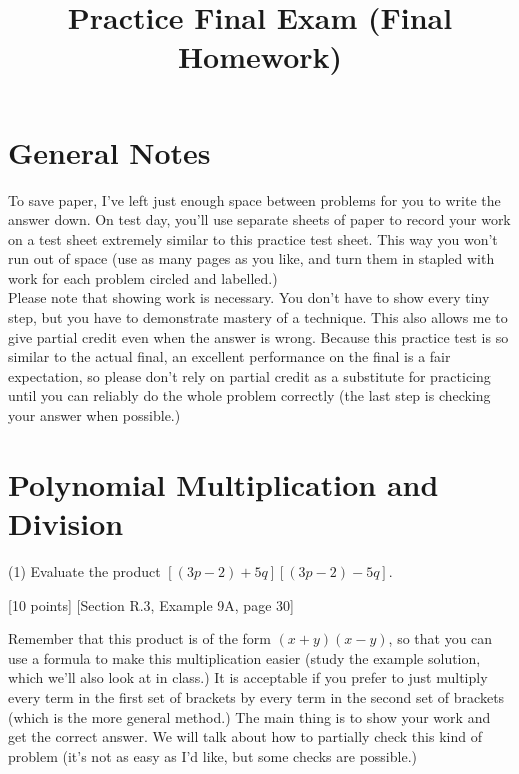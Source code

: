 \documentclass{article}
\title{Practice Final Exam (Final Homework)}
\begin{document}
\maketitle

\section{General Notes}
To save paper, I've left just enough space between problems for you to write the answer down. On test day, you'll use separate sheets of paper to record your work on a test sheet extremely similar to this practice test sheet. This way you won't run out of space (use as many pages as you like, and turn them in stapled with work for each problem circled and labelled.) \\

Please note that showing work is necessary. You don't have to show every tiny step, but you have to demonstrate mastery of a technique. This also allows me to give partial credit even when the answer is wrong. Because this practice test is so similar to the actual final, an excellent performance on the final is a fair expectation, so please don't rely on partial credit as a substitute for practicing until you can reliably do the whole problem correctly (the last step is checking your answer when possible.)


\section{Polynomial Multiplication and Division}

(1) Evaluate the product $[(3p-2)+ 5q][(3p-2) -5q]$.

[10 points] [Section R.3, Example 9A, page 30]

Remember that this product is of the form $(x + y)(x -y)$, so that you can use a formula to make this multiplication easier (study the example solution, which we'll also look at in class.) It is acceptable if you prefer to just multiply every term in the first set of brackets by every term in the second set of brackets (which is the more general method.) The main thing is to show your work and get the correct answer. We will talk about how to partially check this kind of problem (it's not as easy as I'd like, but some checks are possible.)\\\\\\\\\\\
\end{document}
